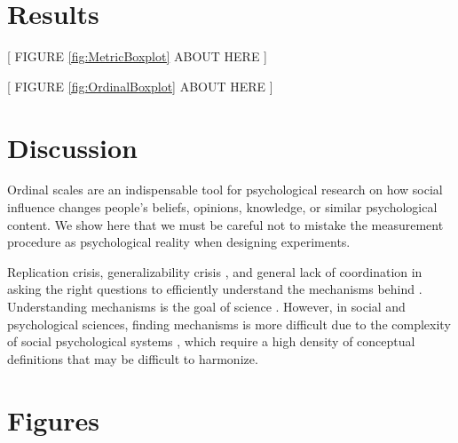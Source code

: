 \documentclass[
  abstract]{article}
\begin{document}
\section{Results}\label{results}


\vspace{0.5em}
\begin{center}
{[ FIGURE \ref{fig:MetricBoxplot} ABOUT HERE ]} \\
\end{center}


\vspace{0.5em}
\begin{center}
{[ FIGURE \ref{fig:OrdinalBoxplot} ABOUT HERE ]} \\
\end{center}

\section{Discussion}\label{discussion}

Ordinal scales are an indispensable tool for psychological research on
how social influence changes people's beliefs, opinions, knowledge, or
similar psychological content. We show here that we must be careful not
to mistake the measurement procedure as psychological reality when
designing experiments.

Replication crisis, generalizability crisis \autocite{Yarkoni2022}, and
general lack of coordination in asking the right questions to
efficiently understand the mechanisms behind . Understanding mechanisms
is the goal of science \autocite{Machamer2000,Craver2006}. However, in
social and psychological sciences, finding mechanisms is more difficult
due to the complexity of social psychological systems
\autocite{Dubova2023}, which require a high density of conceptual
definitions that may be difficult to harmonize.


\printbibliography[title=References]

\appendix

\section{Figures}
\end{document}
